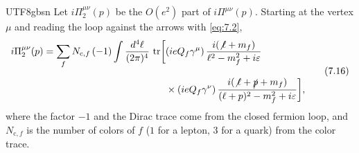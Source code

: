 \documentclass[11pt,a4paper,oneside]{report}
\begin{document}
\begin{CJK*}{UTF8}{gbsn}
Let $i\Pi_2^{\mu\nu}(p)$ be the $O(e^2)$ part of $i\Pi^{\mu\nu}(p)$. Starting at the vertex $\mu$ and reading the loop against the arrows with \eqref{eq:7.2},
\begin{equation*}
\begin{aligned}
i\Pi_2^{\mu\nu}(p)
=\sum_fN_{\mathrm c,f}\,(-1)\int\frac{d^4\ell}{(2\pi)^4}\,
\operatorname{tr}\biggl[
&(ieQ_f\gamma^\mu)\,\frac{i(\not\ell+m_f)}{\ell^2-m_f^2+i\varepsilon}\\[6pt]
&\times(ieQ_f\gamma^\nu)\,\frac{i(\not\ell+\slashed{p}+m_f)}{(\ell+p)^2-m_f^2+i\varepsilon}\biggr],
\end{aligned}
\tag{7.16}\label{eq:7.16}
\end{equation*}
where the factor $-1$ and the Dirac trace come from the closed fermion loop, and $N_{\mathrm c,f}$ is the number of colors of $f$ ($1$ for a lepton, $3$ for a quark) from the color trace.


\end{CJK*}
\end{document}
